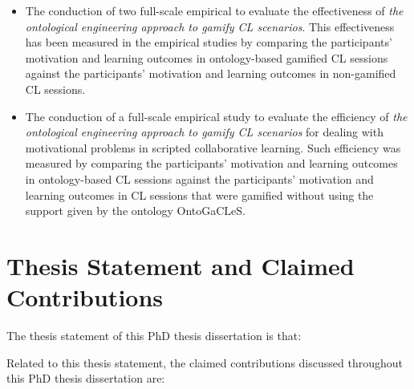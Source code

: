 \begin{description}
\begin{itemize}
\item
The conduction of two full-scale empirical to evaluate the effectiveness of \emph{the ontological engineering approach to gamify CL scenarios}.
This effectiveness has been measured in the empirical studies by comparing the participants' motivation and learning outcomes in ontology-based gamified CL sessions against the participants' motivation and learning outcomes in non-gamified CL sessions.


\item
The conduction of a full-scale empirical study to evaluate the efficiency of \emph{the ontological engineering approach to gamify CL scenarios} for dealing with motivational problems in scripted collaborative learning.
Such efficiency was measured by comparing the participants' motivation and learning outcomes in ontology-based CL sessions against the participants' motivation and learning outcomes in CL sessions that were gamified without using the support given by the ontology OntoGaCLeS.
\end{itemize}
\end{description}


\section{Thesis Statement and Claimed Contributions}
\label{sec:thesis-statement-and-claimed-contributions}

The thesis statement of this PhD thesis dissertation is that:


Related to this thesis statement, the claimed contributions discussed throughout this PhD thesis dissertation are:

